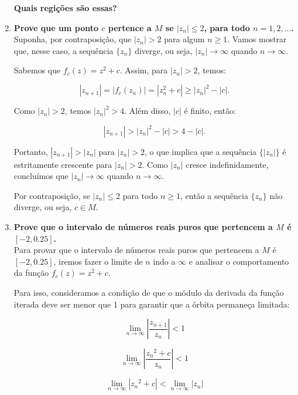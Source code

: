 \begin{enumerate}[label=(\alph*)]
        \textbf{\color{red} Quais regições são essas?}


    \item \textbf{Prove que um ponto \( c \) pertence a \( M \) se \( |z_n| \leq 2 \), para todo \( n = 1, 2, \ldots \). }\\

        Suponha, por contraposição, que \( |z_n| > 2 \) para algum \( n \geq 1 \). Vamos mostrar que, nesse caso, a sequência \( \{z_n\} \) diverge, ou seja, \( |z_n| \to \infty \) quando \( n \to \infty \).

        Sabemos que \( f_c(z) = z^2 + c \). Assim, para \( |z_n| > 2 \), temos:

        \[
        |z_{n+1}| = |f_c(z_n)| = |z_n^2 + c| \geq |z_n|^2 - |c|.
        \]

        Como \( |z_n| > 2 \), temos \( |z_n|^2 > 4 \). Além disso, \( |c| \) é finito, então:

        \[
        |z_{n+1}| > |z_n|^2 - |c| > 4 - |c|.
        \]

        Portanto, \( |z_{n+1}| > |z_n| \) para \( |z_n| > 2 \), o que implica que a sequência \( \{|z_n|\} \) é estritamente crescente para \( |z_n| > 2 \). Como \( |z_n| \) cresce indefinidamente, concluímos que \( |z_n| \to \infty \) quando \( n \to \infty \).

        Por contraposição, se \( |z_n| \leq 2 \) para todo \( n \geq 1 \), então a sequência \( \{z_n\} \) não diverge, ou seja, \( c \in M \).


    \item \textbf{Prove que o intervalo de números reais puros que pertencem a \( M \) é \( [-2, 0.25] \). }\\
    
        Para provar que o intervalo de números reais puros que pertencem a \( M \) é \( [-2, 0.25] \), iremos fazer o limite de \( n \) indo a \( \infty \) e analisar o comportamento da função \( f_c(z) = z^2 + c \).

        Para isso, consideramos a condição de que o módulo da derivada da função iterada deve ser menor que 1 para garantir que a órbita permaneça limitada:

        \[
        \lim_{n \to \infty} \left| \frac{z_{n+1}}{z_n} \right| < 1
        \]

        \[
        \lim_{n \to \infty} \left| \frac{{z_n}^2 + c}{z_n} \right| < 1
        \]

        \[
        \lim_{n \to \infty} \left| {z_n}^2 + c \right| < \lim_{n \to \infty} \left| z_n \right| 
        \]


\end{enumerate}
